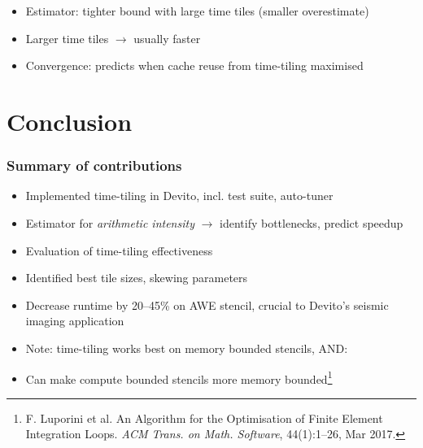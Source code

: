 \documentclass{beamer}
\begin{document}
\begin{frame}
\begin{itemize}
	\item Estimator: tighter bound with large time tiles (smaller overestimate)
	\item Larger time tiles \(\rightarrow\) usually faster
	\item Convergence: predicts when cache reuse from time-tiling maximised
\end{itemize}
\end{frame}



\section{Conclusion}

\begin{frame}
\frametitle{Summary of contributions}

\begin{itemize}
	\item Implemented time-tiling in Devito, incl. test suite, auto-tuner
	\item Estimator for \emph{arithmetic intensity} \(\rightarrow\) identify bottlenecks, predict speedup
	\item Evaluation of time-tiling effectiveness
	\item Identified best tile sizes, skewing parameters
	\item Decrease runtime by 20--45\% on AWE stencil, crucial to Devito's seismic imaging application
	\newline
	\item Note: time-tiling works best on memory bounded stencils, AND:
	\item Can make compute bounded stencils more memory bounded\footnote{F. Luporini et al. An Algorithm for the Optimisation of Finite Element Integration Loops. \emph{ACM Trans. on Math. Software}, 44(1):1--26, Mar 2017.}
\end{itemize}
\end{frame}
\end{document}

